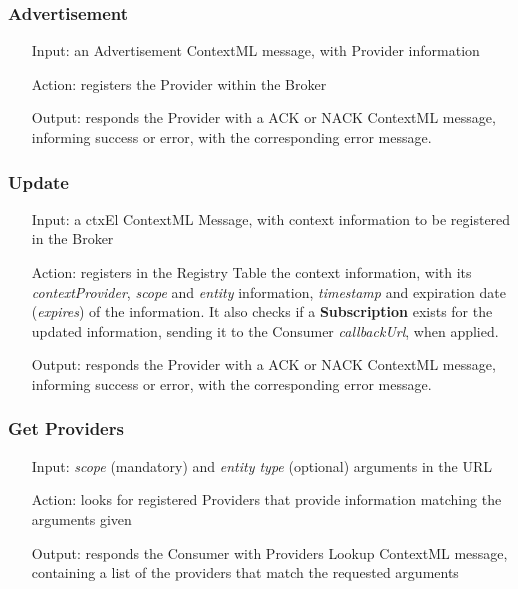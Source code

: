 \subsubsection{Advertisement}
\begin{itemize}
	\item[Input:] an Advertisement ContextML message, with Provider information
	
	\item[Action:] registers the Provider within the Broker
	
	\item[Output:] responds the Provider with a ACK or NACK ContextML message, informing success or error, with the corresponding error message.
\end{itemize}

\subsubsection{Update}
\begin{itemize}
	\item[Input:] a ctxEl ContextML Message, with context information to be registered in the Broker
	
	\item[Action:] registers in the Registry Table the context information, with its \textit{contextProvider}, \textit{scope} and \textit{entity} information, \textit{timestamp} and expiration date (\textit{expires}) of the information. It also checks if a \textbf{Subscription} exists for the updated information, sending it to the Consumer \textit{callbackUrl}, when applied.
	
	\item[Output:] responds the Provider with a ACK or NACK ContextML message, informing success or error, with the corresponding error message.
\end{itemize}

\subsubsection{Get Providers}
\begin{itemize}
	\item[Input:] \textit{scope} (mandatory) and \textit{entity type} (optional) arguments in the URL
	
	\item[Action:] looks for registered Providers that provide information matching the arguments given
	
	\item[Output:] responds the Consumer with Providers Lookup ContextML message, containing a list of the providers that match the requested arguments
\end{itemize}

